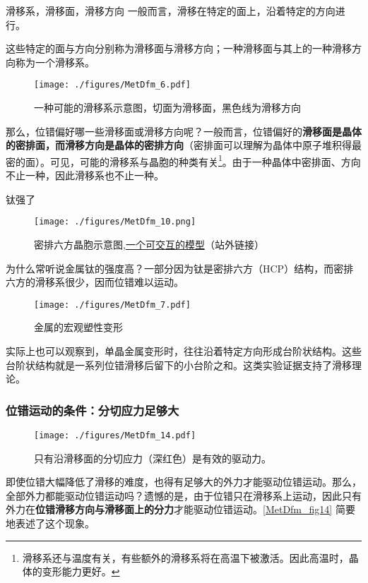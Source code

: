 \begin{theorem}{滑移系，滑移面，滑移方向}
一般而言，滑移在特定的面上，沿着特定的方向进行。

这些特定的面与方向分别称为滑移面与滑移方向；一种滑移面与其上的一种滑移方向称为一个滑移系。

\end{theorem}
\begin{figure}[ht]
\centering
\texttt{[image: ./figures/MetDfm\_6.pdf]}
\caption{一种可能的滑移系示意图，切面为滑移面，黑色线为滑移方向} \label{MetDfm_fig6}
\end{figure}

那么，位错偏好哪一些滑移面或滑移方向呢？一般而言，位错偏好的\textbf{滑移面是晶体的密排面，而滑移方向是晶体的密排方向}（密排面可以理解为晶体中原子堆积得最密的面）。可见，可能的滑移系与晶胞的种类有关\footnote{滑移系还与温度有关，有些额外的滑移系将在高温下被激活。因此高温时，晶体的变形能力更好。}。由于一种晶体中密排面、方向不止一种，因此滑移系也不止一种。

\begin{example}{钛强了}
\begin{figure}[ht]
\centering
\texttt{[image: ./figures/MetDfm\_10.png]}
\caption{密排六方晶胞示意图,\href{https://www.geogebra.org/m/xrzejabt}{一个可交互的模型}（站外链接）} \label{MetDfm_fig10}
\end{figure}
为什么常听说金属钛的强度高？一部分因为钛是密排六方（HCP）结构，而密排六方的滑移系很少，因而位错难以运动。
\end{example}

\begin{figure}[ht]
\centering
\texttt{[image: ./figures/MetDfm\_7.pdf]}
\caption{金属的宏观塑性变形} \label{MetDfm_fig7}
\end{figure}
实际上也可以观察到，单晶金属变形时，往往沿着特定方向形成台阶状结构。这些台阶状结构就是一系列位错滑移后留下的小台阶之和。这类实验证据支持了滑移理论。


\subsubsection{位错运动的条件：分切应力足够大}

\begin{figure}[ht]
\centering
\texttt{[image: ./figures/MetDfm\_14.pdf]}
\caption{只有沿滑移面的分切应力（深红色）是有效的驱动力。} \label{MetDfm_fig14}
\end{figure}

即使位错大幅降低了滑移的难度，也得有足够大的外力才能驱动位错运动。那么，全部外力都能驱动位错运动吗？遗憾的是，由于位错只在滑移系上运动，因此只有外力在\textbf{位错滑移方向与滑移面上的分力}才能驱动位错运动。\autoref{MetDfm_fig14} 简要地表述了这个现象。


